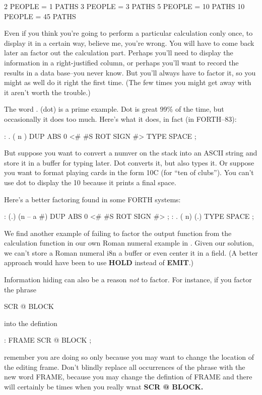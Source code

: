 \begin{Code}
2 PEOPLE = 1 PATHS
3 PEOPLE = 3 PATHS
5 PEOPLE = 10 PATHS
10 PEOPLE = 45 PATHS
\end{Code}
Even if you think you're going to perform a particular calculation conly once, to display it in a certain way, believe me, you're wrong. You will have to come back later an factor out the calculation part. Perhaps you'll need to display the information in a right-justified column, or perhaps you'll want to record the results in a data base--you never know. But you'll always have to factor it, so you might as well do it right the first time. (The few times you might get away with it aren't worth the trouble.)

The word . (dot) is a prime example. Dot is great 99\% of the time, but occasionally it does too much. Here's what it does, in fact (in FORTH--83):

\begin{Code}
: .   ( n )  DUP ABS 0 <# #S  ROT SIGN  #> TYPE SPACE ;
\end{Code}
But suppose you want to convert a numver on the stack into an ASCII string and store it in a buffer for typing later. Dot converts it, but also types it. Or suppose you want to format playing cards in the form 10C (for ``ten of clubs''). You can't use dot to display the 10 because it prints a final space.

Here's a better factoring found in some FORTH systems:

\begin{Code}
: (.)  (n -- a #)  DUP ABS 0  <# #S  ROT SIGN  #> ;
: .  ( n)  (.) TYPE SPACE ;
\end{Code}
We find another example of failing to factor the output function from the calculation function in our own Roman numeral example in . Given our solution, we can't store a Roman numeral i8n a buffer or even center it in a field. (A better approach would have been to use \textbf{HOLD} instead of \textbf{EMIT}.)

Information hiding can also be a reason \emph{not} to factor. For instance, if you factor the phrase

\begin{Code}
SCR @ BLOCK
\end{Code}
into the defintion

\begin{Code}
: FRAME   SCR @ BLOCK ;
\end{Code}
remember you are doing so only because you may want to change the location of the editing frame. Don't blindly replace all occurrences of the phrase with the new word FRAME, because you may change the defintion of FRAME and there will certainly be times when you really wnat \textbf{SCR @ BLOCK.}

